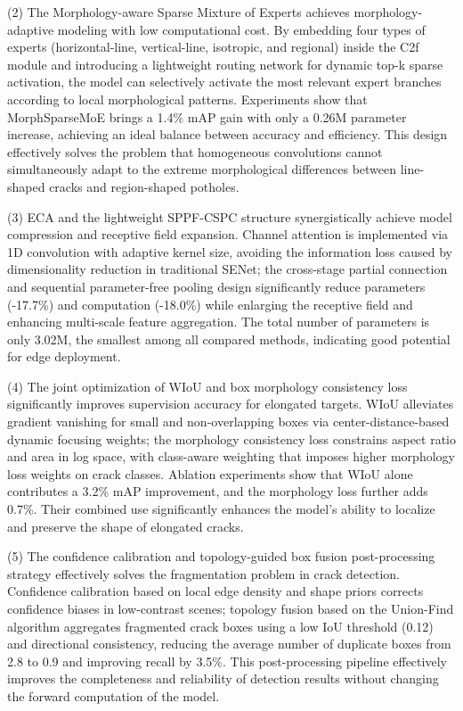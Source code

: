 \documentclass[twocolumn]{sn-jnl}
\begin{document}
	(2) The Morphology-aware Sparse Mixture of Experts achieves morphology-adaptive modeling with low computational cost. By embedding four types of experts (horizontal-line, vertical-line, isotropic, and regional) inside the C2f module and introducing a lightweight routing network for dynamic top-k sparse activation, the model can selectively activate the most relevant expert branches according to local morphological patterns. Experiments show that MorphSparseMoE brings a 1.4\% mAP gain with only a 0.26M parameter increase, achieving an ideal balance between accuracy and efficiency. This design effectively solves the problem that homogeneous convolutions cannot simultaneously adapt to the extreme morphological differences between line-shaped cracks and region-shaped potholes.
	
	(3) ECA and the lightweight SPPF-CSPC structure synergistically achieve model compression and receptive field expansion. Channel attention is implemented via 1D convolution with adaptive kernel size, avoiding the information loss caused by dimensionality reduction in traditional SENet; the cross-stage partial connection and sequential parameter-free pooling design significantly reduce parameters (-17.7\%) and computation (-18.0\%) while enlarging the receptive field and enhancing multi-scale feature aggregation. The total number of parameters is only 3.02M, the smallest among all compared methods, indicating good potential for edge deployment.
	
	(4) The joint optimization of WIoU and box morphology consistency loss significantly improves supervision accuracy for elongated targets. WIoU alleviates gradient vanishing for small and non-overlapping boxes via center-distance-based dynamic focusing weights; the morphology consistency loss constrains aspect ratio and area in log space, with class-aware weighting that imposes higher morphology loss weights on crack classes. Ablation experiments show that WIoU alone contributes a 3.2\% mAP improvement, and the morphology loss further adds 0.7\%. Their combined use significantly enhances the model's ability to localize and preserve the shape of elongated cracks.
	
	(5) The confidence calibration and topology-guided box fusion post-processing strategy effectively solves the fragmentation problem in crack detection. Confidence calibration based on local edge density and shape priors corrects confidence biases in low-contrast scenes; topology fusion based on the Union-Find algorithm aggregates fragmented crack boxes using a low IoU threshold (0.12) and directional consistency, reducing the average number of duplicate boxes from 2.8 to 0.9 and improving recall by 3.5\%. This post-processing pipeline effectively improves the completeness and reliability of detection results without changing the forward computation of the model.
	
\end{document}
